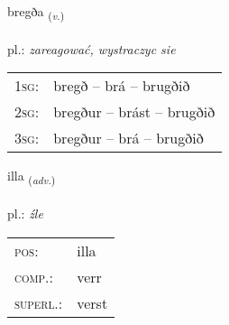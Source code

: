 \documentclass[frontgrid, backgrid]{flacards}\usepackage[]{graphicx}\usepackage[]{xcolor}
\begin{document}
{bregða \small{\textsubscript{(\textit{v.})}} \\[1ex] %
\textphonetic{[prɛɣða]} \\
pl.: \emph{zareagować, wystraczyc sie} \\  [2ex]
\renewcommand*{\arraystretch}{0.8}
\begin{tabular}{p{1cm}l}
\textsc{1sg}: & bregð -- brá -- brugðið \\ 
\textsc{2sg}: & bregður -- brást -- brugðið \\ 
\textsc{3sg}: & bregður -- brá -- brugðið \\ 
\end{tabular}
}

\renewcommand{\flhead}{\vskip5pt \fboxsep=0pt {\small\bfseries\footnotesize Atviksorð | Adverb}}
\renewcommand{\fcfoot}{\vskip5pt \fboxsep=0pt \hspace{2pt}{\small\bfseries\footnotesize 1K}}

\renewcommand{\blhead}{\vskip5pt {\small\bfseries\footnotesize Atviksorð | Adverb }}
\renewcommand{\bcfoot}{\vskip5pt \hspace{2pt}{\small\bfseries\footnotesize 1K}}


{illa \small{\textsubscript{(\textit{adv.})}} \\[1ex] %
\textphonetic{[ɪtla]} \\
pl.: \emph{źle} \\  [2ex]
\renewcommand*{\arraystretch}{0.8}
\begin{tabular}{ll}
\textsc{pos}: & illa \\ 
\textsc{comp.}: & verr \\ 
\textsc{superl.}: & verst \\
\end{tabular}
}

\renewcommand{\flhead}{\vskip5pt \fboxsep=0pt {\small\bfseries\footnotesize Nafnorð | Noun}}
\renewcommand{\fcfoot}{\vskip5pt \fboxsep=0pt \hspace{2pt}{\small\bfseries\footnotesize 1K}}
\end{document}
